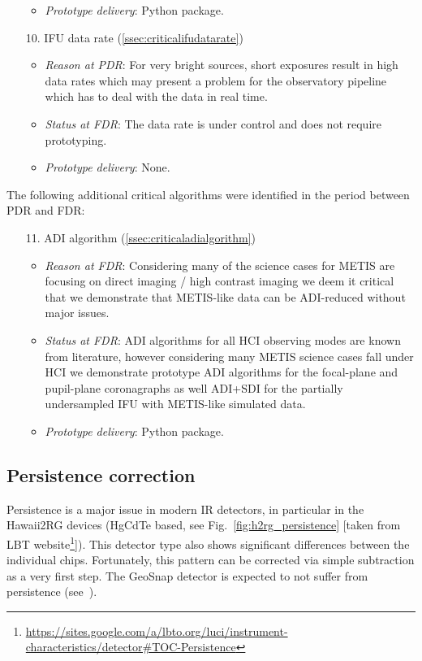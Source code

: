 \begin{enumerate}
\begin{itemize}
        \item \textit{Prototype delivery}: Python package.
    \end{itemize}
    \item[10.] IFU data rate (\ref{ssec:criticalifudatarate})
    \begin{itemize}
        \item \textit{Reason at PDR}: For very bright sources, short exposures result in high data rates which may present a problem for
            the observatory pipeline which has to deal with the data in real time.
        \item \textit{Status at FDR}: The data rate is under control and does not require prototyping.
        \item \textit{Prototype delivery}: None.
    \end{itemize}
\end{enumerate}

The following additional critical algorithms were identified in the period between PDR and FDR:

\begin{enumerate}
    \item[11.] ADI algorithm (\ref{ssec:criticaladialgorithm})
    \begin{itemize}
        \item \textit{Reason at FDR}: Considering many of the science cases for METIS are focusing on direct imaging / high contrast imaging we deem it critical that we demonstrate that METIS-like data can be ADI-reduced without major issues.
        \item \textit{Status at FDR}: ADI algorithms for all HCI observing modes are known from literature, however considering many METIS science cases fall under HCI we demonstrate prototype ADI algorithms for the focal-plane and pupil-plane coronagraphs as well ADI+SDI for the partially undersampled \ac{IFU} with METIS-like simulated data.
        \item \textit{Prototype delivery}: Python package.
    \end{itemize}
\end{enumerate}

\subsection{Persistence correction}
\label{ssec:criticalpersistencecorrection}
\label{sec_persistence_correction}
Persistence is a major issue in modern IR detectors, in particular in the Hawaii2RG devices (HgCdTe based, see Fig.~\ref{fig:h2rg_persistence} [taken from LBT website\footnote{\url{https://sites.google.com/a/lbto.org/luci/instrument-characteristics/detector\#TOC-Persistence}\label{fn:persistence}}]).
This detector type also shows significant differences between the individual chips.
Fortunately, this pattern can be corrected via simple subtraction as a very first step.
The GeoSnap detector is expected to not suffer from persistence (see~\cite{Leisenring_2023}).


